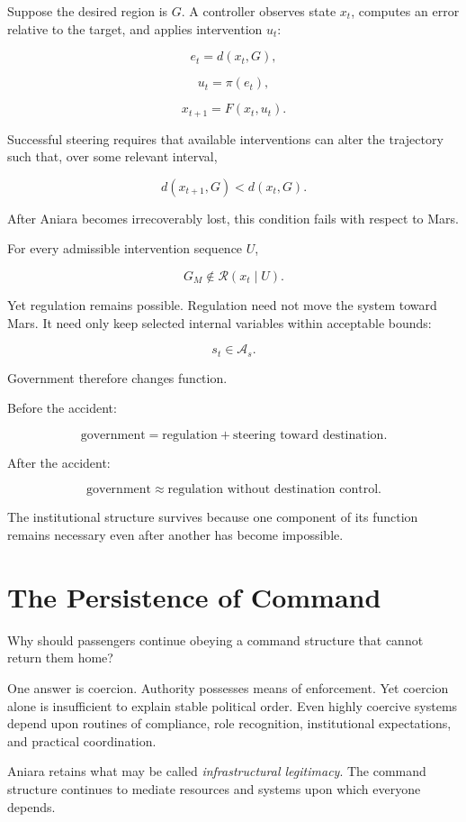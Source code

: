 \documentclass[11pt,oneside]{book}
\theoremstyle{definition}
\theoremstyle{remark}
\newcommand{\A}{\mathcal{A}}
\newcommand{\R}{\mathcal{R}}
\begin{document}
Suppose the desired region is \(G\). A controller observes state \(x_t\), computes an error relative to the target, and applies intervention \(u_t\):

\[
e_t=d(x_t,G),
\]

\[
u_t=\pi(e_t),
\]

\[
x_{t+1}=F(x_t,u_t).
\]

Successful steering requires that available interventions can alter the trajectory such that, over some relevant interval,

\[
d(x_{t+1},G)<d(x_t,G).
\]

After Aniara becomes irrecoverably lost, this condition fails with respect to Mars.

For every admissible intervention sequence \(U\),

\[
G_M\notin\R(x_t\mid U).
\]

Yet regulation remains possible. Regulation need not move the system toward Mars. It need only keep selected internal variables within acceptable bounds:

\[
s_t\in\A_s.
\]

Government therefore changes function.

Before the accident:

\[
\text{government}
=
\text{regulation}
+
\text{steering toward destination}.
\]

After the accident:

\[
\text{government}
\approx
\text{regulation without destination control}.
\]

The institutional structure survives because one component of its function remains necessary even after another has become impossible.

\section{The Persistence of Command}

Why should passengers continue obeying a command structure that cannot return them home?

One answer is coercion. Authority possesses means of enforcement. Yet coercion alone is insufficient to explain stable political order. Even highly coercive systems depend upon routines of compliance, role recognition, institutional expectations, and practical coordination.

Aniara retains what may be called \emph{infrastructural legitimacy}. The command structure continues to mediate resources and systems upon which everyone depends.
\end{document}

